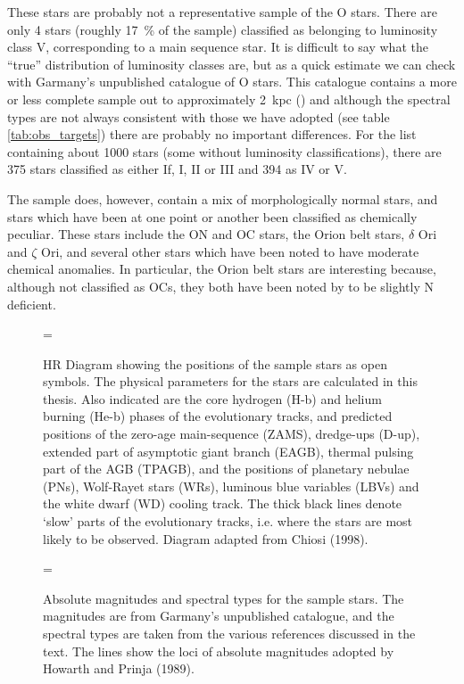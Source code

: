 These stars are probably not a representative sample of the O
stars. There are only 4 stars (roughly 17~\% of the sample) classified
as belonging to luminosity class V, corresponding to a main sequence
star. It is difficult to say what the ``true'' distribution of
luminosity classes are, but as a quick estimate we can check with
Garmany's unpublished catalogue of O stars. This catalogue contains a
more or less complete sample out to approximately 2~kpc
(\cite{ga:imf}) and although the spectral types are not always
consistent with those we have adopted (see table
\ref{tab:obs_targets}) there are probably no important differences. For the
list containing about 1000 stars (some without luminosity
classifications), there are 375 stars classified as either If, I, II
or III and 394 as IV or V.

The sample does, however, contain a mix of morphologically normal
stars, and stars which have been at one point or another been
classified as chemically peculiar. These stars include the ON and OC
stars, the Orion belt stars, $\delta$ Ori and $\zeta$ Ori, and several
other stars which have been noted to have moderate chemical
anomalies. In particular, the Orion belt stars are interesting
because, although not classified as OCs, they both have been noted by
 to be slightly N deficient.


\begin{figure}
\epsfxsize=\figwidth
\setlength{\cen}{(\textwidth / 2) - (\epsfxsize / 2)}
\hspace{\cen}
\caption[HR-diagram]
{\fcfont HR Diagram showing the positions of the sample stars as open
symbols. The physical parameters for the stars are calculated in this
thesis. Also indicated are the core hydrogen (H-b) and helium burning
(He-b) phases of the evolutionary tracks, and predicted positions of
the zero-age main-sequence (ZAMS), dredge-ups (D-up), extended part of
asymptotic giant branch (EAGB), thermal pulsing part of the AGB
(TPAGB), and the positions of planetary nebulae (PNs), Wolf-Rayet
stars (WRs), luminous blue variables (LBVs) and the white dwarf (WD)
cooling track. The thick black lines denote `slow' parts of the
evolutionary tracks, i.e. where the stars are most likely to be
observed. Diagram adapted from Chiosi (1998).}
\label{fig:hrd1}
\end{figure}

\begin{figure}
\epsfxsize=\figwidth
\setlength{\cen}{(\textwidth / 2) - (\epsfxsize / 2)}
\hspace{\cen}
\caption[Spectral types and absolute magnitudes of WHT sample]
{\fcfont Absolute magnitudes and spectral types for the sample
stars. The magnitudes are from Garmany's unpublished catalogue, and
the spectral types are taken from the various references discussed in
the text. The lines show the loci of absolute magnitudes adopted by
Howarth and Prinja (1989).}
\label{fig:hrd2}
\end{figure}

